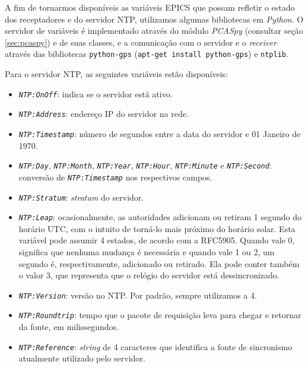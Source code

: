 A fim de tornarmos disponíveis as variáveis EPICS que possam refletir o estado
dos receptadores e do servidor NTP, utilizamos algumas bibliotecas em
\textit{Python}. O servidor de variáveis é implementado através do módulo
\textit{PCASpy} (consultar seção \ref{sec:pcaspy}) e de suas classes, e a
comunicação com o servidor e o \textit{receiver} através das bibliotecas
\texttt{python-gps} (\texttt{apt-get install python-gps}) e \texttt{ntplib}. 

\vspace{12pt}

Para o servidor NTP, as seguintes variáveis estão disponíveis:

\begin{itemize}
  \renewcommand\labelitemi{--}
  \item \textit{\texttt{NTP:OnOff}}: indica se o servidor está ativo.
  
  \item \textit{\texttt{NTP:Address}}: endereço IP do servidor na rede.
  
  \item \textit{\texttt{NTP:Timestamp}}: número de segundos entre a data do
  servidor e 01 Janeiro de 1970.
  
  \item \textit{\texttt{NTP:Day}}, \textit{\texttt{NTP:Month}},
  \textit{\texttt{NTP:Year}}, \textit{\texttt{NTP:Hour}},
  \textit{\texttt{NTP:Minute}} e \textit{\texttt{NTP:Second}}:
  conversão de \textit{\texttt{NTP:Timestamp}} nos respectivos campos.
  
  \item \textit{\texttt{NTP:Stratum}}: \textit{stratum} do servidor.
  
  \item \textit{\texttt{NTP:Leap}}: ocasionalmente, as autoridades adicionam
  ou retiram 1 segundo do horário UTC, com o intuito de torná-lo mais
  próximo do horário solar. Esta variável pode assumir 4 estados, de acordo
  com a RFC5905. Quando vale 0, significa que nenhuma mudança é necessária e
  quando vale 1 ou 2, um segundo é, respectivamente, adicionado ou retirado. Ela
  pode conter também o valor 3, que representa que o relógio do servidor está
  dessincronizado.

  \item  \textit{\texttt{NTP:Version}}: versão no NTP. Por padrão, sempre
  utilizamos a 4.

  \item  \textit{\texttt{NTP:Roundtrip}}: tempo que o pacote de requisição leva
  para chegar e retornar da fonte, em milissegundos.

  \item \textit{\texttt{NTP:Reference}}: \textit{string} de 4 caracteres que
  identifica a fonte de sincronismo atualmente utilizado pelo servidor.
\end{itemize}

